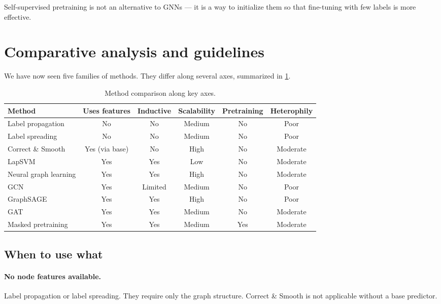 \begin{notechapter}
Self-supervised pretraining is not an alternative to GNNs --- it is a way to
initialize them so that fine-tuning with few labels is more effective.

\section{Comparative analysis and guidelines}
\label{semi-supervised-graphs:sec:compare}

We have now seen five families of methods. They differ along several axes,
summarized in \cref{semi-supervised-graphs:tab:comparison}.

\begin{table}[ht]
\centering\small
\begin{tabular}{lccccc}
\toprule
Method & Uses features & Inductive &
Scalability & Pretraining & Heterophily \\ \midrule
Label propagation & No & No & Medium & No & Poor \\
Label spreading & No & No & Medium & No & Poor \\
Correct \& Smooth & Yes (via base) & No & High & No & Moderate \\
LapSVM & Yes & Yes & Low & No & Moderate \\
Neural graph learning & Yes & Yes & High & No & Moderate \\
GCN & Yes & Limited & Medium & No & Poor \\
GraphSAGE & Yes & Yes & High & No & Poor \\
GAT & Yes & Yes & Medium & No & Moderate \\
Masked pretraining & Yes & Yes & Medium & Yes & Moderate \\
\bottomrule
\end{tabular}
\caption{Method comparison along key axes.}
\label{semi-supervised-graphs:tab:comparison}
\end{table}

\subsection{When to use what}

\paragraph{No node features available.}
Label propagation or label spreading. They require only the graph structure.
Correct \& Smooth is not applicable without a base predictor.


\end{notechapter}

